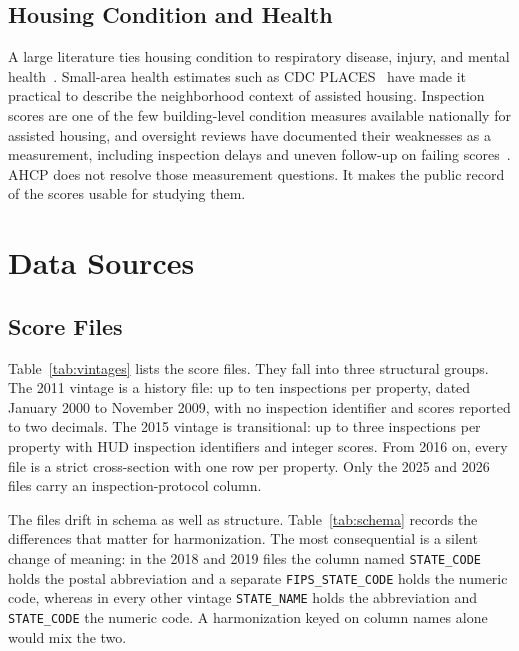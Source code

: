 \documentclass[10pt,twocolumn,letterpaper]{article}
\newcommand{\col}[1]{\texttt{\small #1}}
\begin{document}
\subsection{Housing Condition and Health}
A large literature ties housing condition to respiratory disease, injury, and mental health~\cite{krieger2002,jacobs2011,swope2019}. Small-area health estimates such as CDC PLACES~\cite{greenlund2022} have made it practical to describe the neighborhood context of assisted housing. Inspection scores are one of the few building-level condition measures available nationally for assisted housing, and oversight reviews have documented their weaknesses as a measurement, including inspection delays and uneven follow-up on failing scores~\cite{gao2001,gao2019,oig2024}. AHCP does not resolve those measurement questions. It makes the public record of the scores usable for studying them.

\section{Data Sources}\label{sec:sources}
\subsection{Score Files}
Table~\ref{tab:vintages} lists the \rawFiles{} score files. They fall into three structural groups. The 2011 vintage is a history file: up to ten inspections per property, dated January 2000 to November 2009, with no inspection identifier and scores reported to two decimals. The 2015 vintage is transitional: up to three inspections per property with HUD inspection identifiers and integer scores. From 2016 on, every file is a strict cross-section with one row per property. Only the 2025 and 2026 files carry an inspection-protocol column.

\begin{table}[t]
\caption{HUD physical inspection score files used in AHCP v1.0. PH = public housing, MF = multifamily. First and Last are the earliest and latest inspection months listed. Max/prop. is the largest number of inspections listed for one property.}\label{tab:vintages}
\centering\footnotesize
\resizebox{\columnwidth}{!}{}
\end{table}

The files drift in schema as well as structure. Table~\ref{tab:schema} records the differences that matter for harmonization. The most consequential is a silent change of meaning: in the 2018 and 2019 files the column named \col{STATE\_CODE} holds the postal abbreviation and a separate \col{FIPS\_STATE\_CODE} holds the numeric code, whereas in every other vintage \col{STATE\_NAME} holds the abbreviation and \col{STATE\_CODE} the numeric code. A harmonization keyed on column names alone would mix the two.
\end{document}
